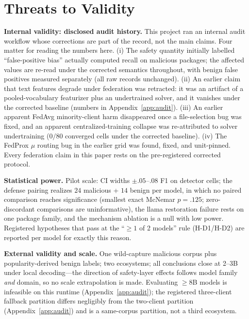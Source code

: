 \documentclass[sigconf,nonacm]{acmart}
\begin{document}
\section{Threats to Validity}\label{sec:threats}
\textbf{Internal validity: disclosed audit history.} This project ran an
internal audit workflow whose corrections are part of the record, not the
main claims. Four matter for reading the numbers here. (i) The safety
quantity initially labelled ``false-positive bias'' actually computed
recall on malicious packages; the affected values are re-read under the
corrected semantics throughout, with benign false positives measured
separately (all raw records unchanged). (ii) An earlier claim that text
features degrade under federation was retracted: it was an artifact of a
pooled-vocabulary featurizer plus an undertrained solver, and it vanishes
under the corrected baseline (numbers in Appendix~\ref{app:audit}).
(iii) An earlier apparent FedAvg minority-client harm disappeared once a
file-selection bug was fixed, and an apparent centralized-training
collapse was re-attributed to solver undertraining ($0/80$ converged
cells under the corrected baseline). (iv) The FedProx $\mu$ routing bug
in the earlier grid was found, fixed, and unit-pinned. Every federation
claim in this paper rests on the pre-registered corrected protocol.

\textbf{Statistical power.} Pilot scale: CI widths ${\pm}.05$--$.08$ F1
on detector cells; the defense pairing realizes $24$ malicious + $14$
benign per model, in which no paired comparison reaches significance
(smallest exact McNemar $p{=}.125$; zero-discordant comparisons are
uninformative), the llama restoration failure rests on one package
family, and the mechanism ablation is a null with low power. Registered
hypotheses that pass at the ``${\ge}1$ of 2 models'' rule (H-D1/H-D2) are
reported per model for exactly this reason.

\textbf{External validity and scale.} One wild-capture malicious corpus
plus popularity-derived benign labels; two ecosystems; all conclusions
close at 2--3B under local decoding---the direction of safety-layer
effects follows model family \emph{and} domain, so no scale
extrapolation is made. Evaluating ${\ge}8$B models is infeasible on this
runtime (Appendix~\ref{app:audit}); the registered three-client fallback
partition differs negligibly from the two-client partition
(Appendix~\ref{app:audit}) and is a same-corpus partition, not a third
ecosystem.
\end{document}
